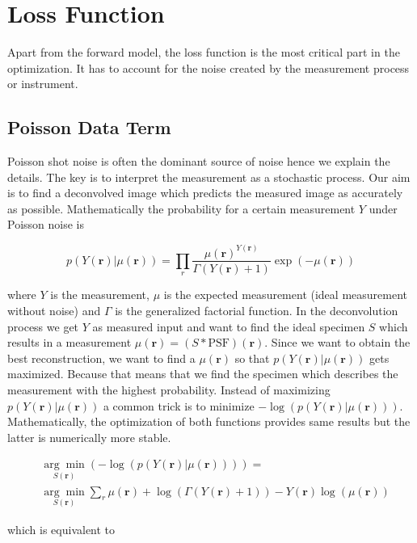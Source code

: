 \documentclass{juliacon}
\begin{document}
\section{Loss Function}
    Apart from the forward model, the loss function is the most critical part in the optimization.
    It has to account for the noise created by the measurement process or instrument. 

\subsection{Poisson Data Term}
    Poisson shot noise is often the dominant source of noise hence we 
    explain the details.
    The key is to interpret the measurement as a stochastic process. 
    Our aim is to find a deconvolved image which predicts the measured image as accurately as 
    possible.
    Mathematically the probability for a certain measurement $Y$ under Poisson noise is


\begin{equation}
    p(Y(\mathbf r)|\mu(\mathbf r)) = \prod_r \frac{\mu(\mathbf r)^{Y(\mathbf r)}}{\Gamma(Y(\mathbf r) + 1)} \exp(- \mu(\mathbf r))
\end{equation}

where $Y$ is the measurement, $\mu$ is the expected measurement (ideal measurement without noise) and $\Gamma$ is the generalized factorial function.
In the deconvolution process we get $Y$ as measured input and want to find the ideal specimen $S$ which results in a measurement $\mu(\mathbf r) = (S * \text{PSF})(\mathbf r)$.
Since we want to obtain the best reconstruction, we want 
to find a $\mu(\mathbf r)$ so that $p(Y(\mathbf r) | \mu(\mathbf r))$ gets maximized.
Because that means
that we find the specimen which describes the measurement with the highest probability.
Instead of maximizing $p(Y(\mathbf r) | \mu(\mathbf r))$ a common trick is to minimize $- \log(p(Y(\mathbf r)|\mu(\mathbf r)))$. 
Mathematically, the optimization of both functions provides same results but the latter is numerically more stable.

\begin{align}
&\underset{S(\mathbf r)}{\arg \min} (- \log(p(Y(\mathbf r)|\mu(\mathbf r)))) =\\ &\underset{S(\mathbf r)}{\arg \min} \sum_r \mu(\mathbf r) + \log(\Gamma(Y(\mathbf r) + 1)) - Y(\mathbf r) \log(\mu(\mathbf r))
\end{align}

which is equivalent to
\end{document}
